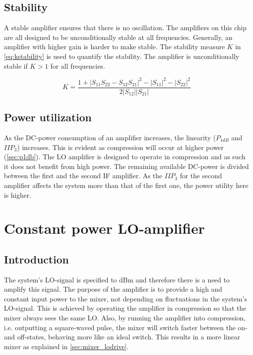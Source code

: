 		\subsection{Stability}
			A stable amplifier ensures that there is no oscillation.\autocite{grosch99} The amplifiers on this chip are all designed to be unconditionally stable at all frequencies. Generally, an amplifier with higher gain is harder to make stable. The stability measure $K$ in \autoref{eq:kstability} is used to quantify the stability. The amplifier is unconditionally stable if $K>1$ for all frequencies.

			\begin{equation}\label{eq:kstability}
				K=\frac{1+|S_{11}S_{22}-S_{12}S_{21}|^2-|S_{11}|^2-|S_{22}|^2}{2|S_{12}||S_{21}|}
			\end{equation}

		\subsection{Power utilization}\label{sec:power}
			As the DC-power consumption of an amplifier increases, the linearity ($P_{1dB}$ and $IIP_3$) increases. This is evident as compression will occur at higher power (\autoref{sec:p1db}). The LO amplifier is designed to operate in compression and as such it does not benefit from high power. The remaining available DC-power is divided between the first and the second IF amplifier. As the $IIP_3$ for the second amplifier affects the system more than that of the first one, the power utility here is higher.

	\section{Constant power LO-amplifier}\label{sec:lo_amp}
		\subsection{Introduction}
			The system's LO-signal is specified to \unit[-5--0]{dBm} and therefore there is a need to amplify this signal. The purpose of the amplifier is to provide a high and constant input power to the mixer, not depending on fluctuations in the system's LO-signal. This is achieved by operating the amplifier in compression so that the mixer always sees the same LO. Also, by running the amplifier into compression, i.e. outputting a square-waved pulse, the mixer will switch faster between the on- and off-states, behaving more like an ideal switch. This results in a more linear mixer as explained in \autoref{sec:mixer_lodrive}.\autocite{vice03} %



